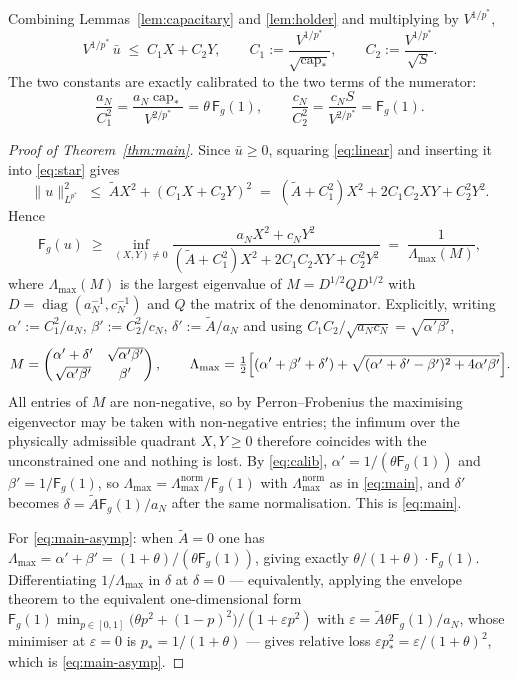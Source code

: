 \documentclass[11pt,reqno]{amsart}
\theoremstyle{plain}
\theoremstyle{definition}
\newcommand{\aN}{a_N}
\newcommand{\cN}{c_N}
\newcommand{\pstar}{p^{*}}
\newcommand{\cpstar}{\operatorname{cap}_{*}}
\newcommand{\Fq}{\mathsf{F}}
\newcommand{\Atil}{\widetilde{A}}
\begin{document}
Combining Lemmas~\ref{lem:capacitary} and \ref{lem:holder} and multiplying by
$V^{1/\pstar}$,
\begin{equation}
\label{eq:linear}
  V^{1/\pstar}\,\bar u\;\le\;C_1X+C_2Y,
  \qquad C_1:=\frac{V^{1/\pstar}}{\sqrt{\cpstar}},\qquad
         C_2:=\frac{V^{1/\pstar}}{\sqrt S}.
\end{equation}
The two constants are exactly calibrated to the two terms of the numerator:
\begin{equation}
\label{eq:calib}
  \frac{\aN}{C_1^2}=\frac{\aN\cpstar}{V^{2/\pstar}}=\theta\,\Fq_g(1),
  \qquad
  \frac{\cN}{C_2^2}=\frac{\cN S}{V^{2/\pstar}}=\Fq_g(1).
\end{equation}

\begin{proof}[Proof of Theorem~\ref{thm:main}]
Since $\bar u\ge0$, squaring \eqref{eq:linear} and inserting it into
\eqref{eq:star} gives
\[
  \|u\|^2_{L^{\pstar}}\;\le\;\Atil X^2+(C_1X+C_2Y)^2
  \;=\;(\Atil+C_1^2)X^2+2C_1C_2XY+C_2^2Y^2 .
\]
Hence
\[
  \Fq_g(u)\;\ge\;\inf_{(X,Y)\neq0}\frac{\aN X^2+\cN Y^2}
    {(\Atil+C_1^2)X^2+2C_1C_2XY+C_2^2Y^2}
  \;=\;\frac1{\Lambda_{\max}(M)},
\]
where $\Lambda_{\max}(M)$ is the largest eigenvalue of
$M=D^{1/2}QD^{1/2}$ with $D=\operatorname{diag}(\aN^{-1},\cN^{-1})$ and $Q$ the
matrix of the denominator. Explicitly, writing
$\alpha':=C_1^2/\aN$, $\beta':=C_2^2/\cN$, $\delta':=\Atil/\aN$ and using
$C_1C_2/\sqrt{\aN\cN}=\sqrt{\alpha'\beta'}$,
\[
  M=\begin{pmatrix}\alpha'+\delta' & \sqrt{\alpha'\beta'}\\[2pt]
                   \sqrt{\alpha'\beta'} & \beta'\end{pmatrix},
  \qquad
  \Lambda_{\max}=\tfrac12\Bigl[(\alpha'+\beta'+\delta')
    +\sqrt{(\alpha'+\delta'-\beta')^2+4\alpha'\beta'}\Bigr].
\]
All entries of $M$ are non-negative, so by Perron--Frobenius the maximising
eigenvector may be taken with non-negative entries; the infimum over the
physically admissible quadrant $X,Y\ge0$ therefore coincides with the
unconstrained one and nothing is lost. By \eqref{eq:calib},
$\alpha'=1/(\theta\Fq_g(1))$ and $\beta'=1/\Fq_g(1)$, so
$\Lambda_{\max}=\Lambda_{\max}^{\mathrm{norm}}/\Fq_g(1)$ with
$\Lambda^{\mathrm{norm}}_{\max}$ as in \eqref{eq:main}, and $\delta'$ becomes
$\delta=\Atil\Fq_g(1)/\aN$ after the same normalisation. This is \eqref{eq:main}.

For \eqref{eq:main-asymp}: when $\Atil=0$ one has
$\Lambda_{\max}=\alpha'+\beta'=(1+\theta)/(\theta\Fq_g(1))$, giving exactly
$\theta/(1+\theta)\cdot\Fq_g(1)$. Differentiating $1/\Lambda_{\max}$ in $\delta$
at $\delta=0$ — equivalently, applying the envelope theorem to the equivalent
one-dimensional form
$\Fq_g(1)\min_{p\in[0,1]}\bigl(\theta p^2+(1-p)^2\bigr)/(1+\varepsilon p^2)$ with
$\varepsilon=\Atil\theta\Fq_g(1)/\aN$, whose minimiser at $\varepsilon=0$ is
$p_*=1/(1+\theta)$ — gives relative loss $\varepsilon p_*^2=\varepsilon/(1+\theta)^2$,
which is \eqref{eq:main-asymp}.
\end{proof}
\end{document}
